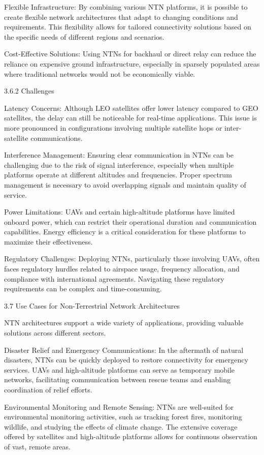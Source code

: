 Flexible Infrastructure: By combining various NTN platforms, it is possible to create flexible network architectures that adapt to changing conditions and requirements. This flexibility allows for tailored connectivity solutions based on the specific needs of different regions and scenarios.

Cost-Effective Solutions: Using NTNs for backhaul or direct relay can reduce the reliance on expensive ground infrastructure, especially in sparsely populated areas where traditional networks would not be economically viable.

3.6.2 Challenges

Latency Concerns: Although LEO satellites offer lower latency compared to GEO satellites, the delay can still be noticeable for real-time applications. This issue is more pronounced in configurations involving multiple satellite hops or inter-satellite communications.

Interference Management: Ensuring clear communication in NTNs can be challenging due to the risk of signal interference, especially when multiple platforms operate at different altitudes and frequencies. Proper spectrum management is necessary to avoid overlapping signals and maintain quality of service.

Power Limitations: UAVs and certain high-altitude platforms have limited onboard power, which can restrict their operational duration and communication capabilities. Energy efficiency is a critical consideration for these platforms to maximize their effectiveness.

Regulatory Challenges: Deploying NTNs, particularly those involving UAVs, often faces regulatory hurdles related to airspace usage, frequency allocation, and compliance with international agreements. Navigating these regulatory requirements can be complex and time-consuming.

3.7 Use Cases for Non-Terrestrial Network Architectures

NTN architectures support a wide variety of applications, providing valuable solutions across different sectors.

Disaster Relief and Emergency Communications: In the aftermath of natural disasters, NTNs can be quickly deployed to restore connectivity for emergency services. UAVs and high-altitude platforms can serve as temporary mobile networks, facilitating communication between rescue teams and enabling coordination of relief efforts.

Environmental Monitoring and Remote Sensing: NTNs are well-suited for environmental monitoring activities, such as tracking forest fires, monitoring wildlife, and studying the effects of climate change. The extensive coverage offered by satellites and high-altitude platforms allows for continuous observation of vast, remote areas.

